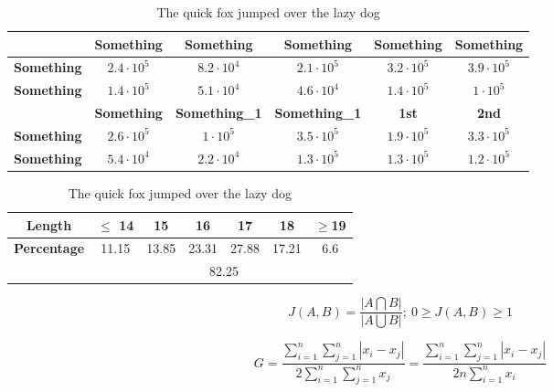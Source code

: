 \documentclass[12pt,phd ,a4paper,oneside]{ucl_thesis}
\begin{document}
\clearpage

\begin{table}[ht]
	\centering
	\begin{tabular}{|c|c|c|c|c|c|}
		\hline \textbf{}& \textbf{Something} & \textbf{Something} & \textbf{Something} & \textbf{Something} & \textbf{Something} \\
		\hline \textbf{Something}& $2.4\cdot10^{5}$ & $8.2\cdot10^{4}$ & $2.1\cdot10^{5}$ & $3.2\cdot10^{5}$ & $3.9\cdot10^{5}$ \\
		\hline \textbf{Something} & $1.4\cdot10^{5}	$ & $5.1\cdot10^{4}$ & $4.6\cdot10^{4}$ & $1.4\cdot10^{5}$ & $1\cdot10^{5}$ \\ \hline
		
		\hline \textbf{}& \textbf{Something}	& \textbf{Something\_1} & \textbf{Something\_1} & \textbf{1st} & \textbf{2nd} \\
		\hline \textbf{Something}& $2.6\cdot10^{5}$ & $1\cdot10^{5}$ & $3.5\cdot10^{5}$ & $1.9\cdot10^{5}$ & $3.3\cdot10^{5}$ \\
		\hline \textbf{Something} & $5.4\cdot10^{4}$ & $2.2\cdot10^{4}$ & $1.3\cdot10^{5}$ & $1.3\cdot10^{5}$ & $1.2\cdot10^{5}$ \\		
		\hline
	\end{tabular}
	\caption[Something]{The quick fox jumped over the lazy dog}\label{table4}
\end{table}


\clearpage

\begin{table}[ht]
	\centering
	\begin{tabular}{|c|c|c|c|c|c|c|}
		\hline 	\textbf{Length} & \textbf{$\leq$ 14} & \textbf{15} & \textbf{16} & \textbf{17} & \textbf{18} & \textbf{$\geq$19} \\ \hline
		\multirow{2}{*}{\textbf{Percentage}} & \multirow{2}{*}{11.15} & 13.85 & 23.31 & 27.88 & 17.21 & \multirow{2}{*}{6.6} \\ \cline{3-6}
		& & \multicolumn{4}{c|}{82.25} &\\ \hline
	\end{tabular}
	\caption[Something]{The quick fox jumped over the lazy dog}\label{table5}
\end{table}

\begin{equation}\label{equation1}%
J\left( A,B\right) =\frac{\left| A \bigcap B \right| }{\left| A \bigcup B\right| };\ 0 \geq J(A,B) \geq 1
\end{equation}


\begin{equation}\label{equation2}%
G=\frac{\sum_{i=1}^{n} \sum_{j=1}^{n}\left| x_{i}-x_{j}\right| }{2\sum_{i=1}^{n} \sum_{j=1}^{n}x_{j}}=
\frac{\sum_{i=1}^{n} \sum_{j=1}^{n}\left| x_{i}-x_{j}\right| }{2n\sum_{i=1}^{n} x_{i}}
\end{equation}
\end{document}
